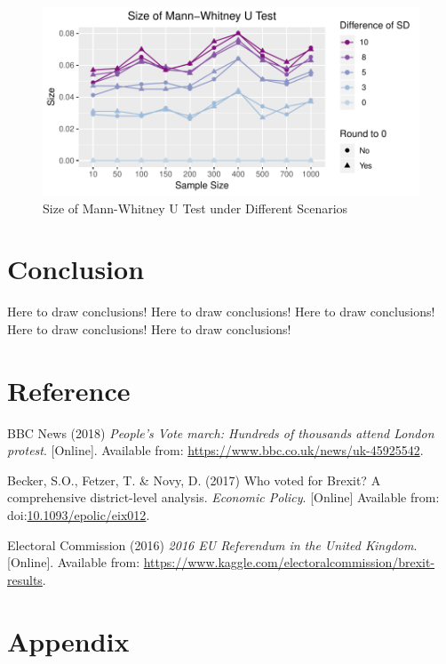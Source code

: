 \documentclass[]{article}
\begin{document}
\begin{figure}
\centering
\includegraphics{../figure/size_mw.pdf}
\caption{Size of Mann-Whitney U Test under Different Scenarios}
\end{figure}

\hypertarget{conclusion}{%
\section{Conclusion}\label{conclusion}}

Here to draw conclusions! Here to draw conclusions! Here to draw
conclusions! Here to draw conclusions! Here to draw conclusions!

\newpage

\hypertarget{reference}{%
\section{Reference}\label{reference}}

\hypertarget{refs}{}
\leavevmode\hypertarget{ref-BBCNews2018}{}%
BBC News (2018) \emph{People's Vote march: Hundreds of thousands attend
London protest}. {[}Online{]}. Available from:
\url{https://www.bbc.co.uk/news/uk-45925542}.

\leavevmode\hypertarget{ref-Becker2017}{}%
Becker, S.O., Fetzer, T. \& Novy, D. (2017) Who voted for Brexit? A
comprehensive district-level analysis. \emph{Economic Policy}.
{[}Online{]} Available from:
doi:\href{https://doi.org/10.1093/epolic/eix012}{10.1093/epolic/eix012}.

\leavevmode\hypertarget{ref-ElectoralCommission2016}{}%
Electoral Commission (2016) \emph{2016 EU Referendum in the United
Kingdom}. {[}Online{]}. Available from:
\url{https://www.kaggle.com/electoralcommission/brexit-results}.

\hypertarget{appendix}{%
\section{Appendix}\label{appendix}}
\end{document}
